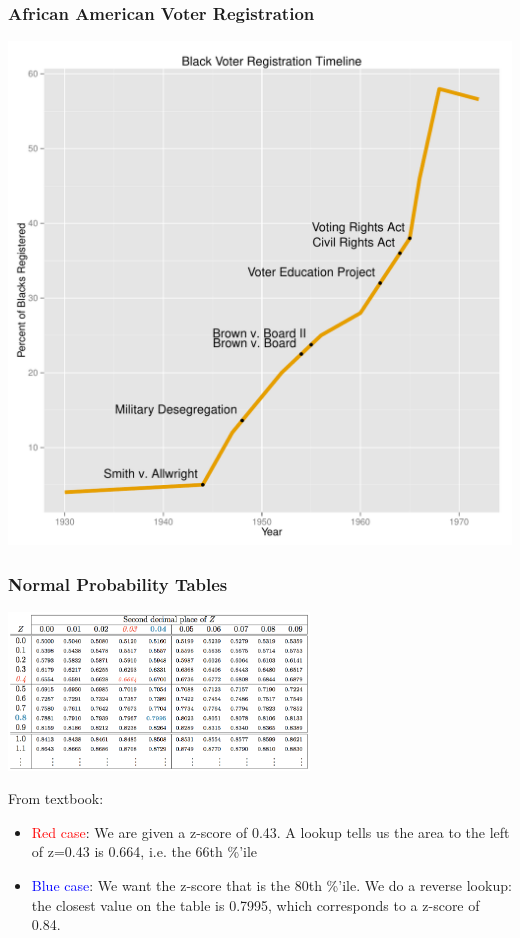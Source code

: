 \documentclass[handout]{beamer}
\begin{document}
\begin{frame}[fragile]
\frametitle{African American Voter Registration}

\begin{center}
\includegraphics[height=0.9\textheight]{figure/voter.pdf}
\end{center}

\end{frame}


\begin{frame}
\frametitle{Normal Probability Tables}
\begin{center}
\includegraphics[width=8cm]{figure/normal_table.png}
\end{center}
From textbook:
\begin{itemize}
\item \textcolor{red}{Red case}: We are given a z-score of 0.43.  A lookup tells us the area to the left of z=0.43 is 0.664, i.e. the 66th \%'ile
\item \textcolor{blue}{Blue case}:  We want the z-score that is the 80th \%'ile.  We do a reverse lookup: the closest value on the table is 0.7995, which corresponds to a z-score of 0.84. 
\end{itemize}


\end{frame}
\end{document}

